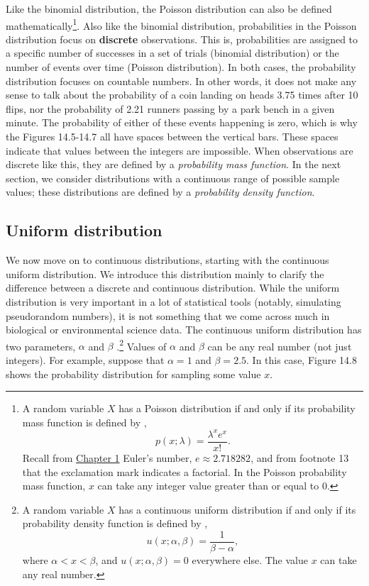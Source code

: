 \documentclass[
]{scrbook}
\begin{document}
Like the binomial distribution, the Poisson distribution can also be defined mathematically\footnote{A random variable \(X\) has a Poisson distribution if and only if its probability mass function is defined by \citep{Miller2004}, \[p \left(x; \lambda \right) = \frac{\lambda^{x}e^{x}}{x!}.\] Recall from \protect\hyperlink{Chapter_1}{Chapter 1} Euler's number, \(e \approx 2.718282\), and from footnote 13 that the exclamation mark indicates a factorial. In the Poisson probability mass function, \(x\) can take any integer value greater than or equal to 0.}.
Also like the binomial distribution, probabilities in the Poisson distribution focus on \textbf{discrete} observations.
This is, probabilities are assigned to a specific number of successes in a set of trials (binomial distribution) or the number of events over time (Poisson distribution).
In both cases, the probability distribution focuses on countable numbers.
In other words, it does not make any sense to talk about the probability of a coin landing on heads 3.75 times after 10 flips, nor the probability of 2.21 runners passing by a park bench in a given minute.
The probability of either of these events happening is zero, which is why the Figures 14.5-14.7 all have spaces between the vertical bars.
These spaces indicate that values between the integers are impossible.
When observations are discrete like this, they are defined by a \emph{probability mass function}.
In the next section, we consider distributions with a continuous range of possible sample values; these distributions are defined by a \emph{probability density function}.

\hypertarget{uniform-distribution}{%
\subsection{Uniform distribution}\label{uniform-distribution}}

We now move on to continuous distributions, starting with the continuous uniform distribution.
We introduce this distribution mainly to clarify the difference between a discrete and continuous distribution.
While the uniform distribution is very important in a lot of statistical tools (notably, simulating pseudorandom numbers), it is not something that we come across much in biological or environmental science data.
The continuous uniform distribution has two parameters, \(\alpha\) and \(\beta\) \citep{Miller2004}.\footnote{A random variable \(X\) has a continuous uniform distribution if and only if its probability density function is defined by \citep{Miller2004}, \[u\left(x; \alpha, \beta\right) = \frac{1}{\beta - \alpha},\] where \(\alpha < x < \beta\), and \(u\left(x; \alpha, \beta\right) = 0\) everywhere else. The value \(x\) can take any real number.}
Values of \(\alpha\) and \(\beta\) can be any real number (not just integers).
For example, suppose that \(\alpha = 1\) and \(\beta = 2.5\).
In this case, Figure 14.8 shows the probability distribution for sampling some value \(x\).
\end{document}
